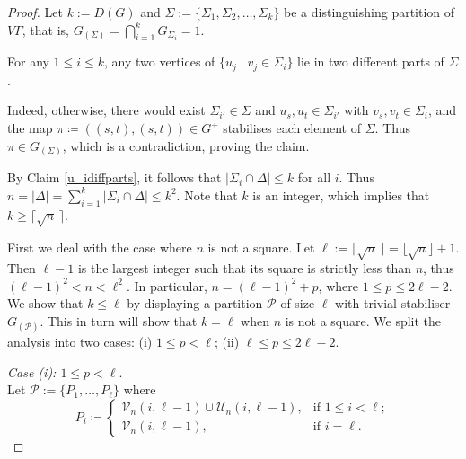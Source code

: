 \documentclass[10pt,a4paper]{amsart}
\begin{document}
\begin{proof}
 
Let \(k:=D(G)\) and $\Sigma:=\{\Sigma_1 , \Sigma_2, \ldots,\Sigma_k\}$  be a distinguishing  partition of \(V\Gamma\), that is, \(G_{(\Sigma)}=\bigcap_{i=1}^{k}G_{\Sigma_{i}}=1\).
\begin{claim}\label{u_idiffparts}
For any \(1\leqslant i\leqslant  k\), any two vertices of \(\{u_j \mid v_j\in \Sigma_i\}\) lie in two different parts of \(\Sigma\).
\end{claim}
Indeed, otherwise, there would exist \(\Sigma_{i'}\in\Sigma\) and \(u_s, u_t\in \Sigma_{i'}\) with \(v_s,v_t\in \Sigma_i\), and the map \(\pi\coloneqq ((s,t),(s,t))\in G^+\) stabilises each element of  \(\Sigma\).
Thus \(\pi\in G_{(\Sigma)}\), which is a contradiction, proving the claim.

By Claim \ref{u_idiffparts}, it follows that \(|\Sigma_{i}\cap \Delta|\leqslant k\) for all \(i\).
Thus \(n=|\Delta|=\sum_{i=1}^{k}|\Sigma_{i}\cap\Delta|\leqslant k^{2}\).
Note that \(k\) is an integer, which implies that \(k\geqslant \lceil\sqrt{n}\,\rceil.\)



First we deal with the case where \(n\) is not a square. 
Let \(\ell:=\lceil\sqrt{n}\,\rceil=\lfloor \sqrt{n}\rfloor+1\).
Then \(\ell-1\) is the largest integer such that its square is strictly less than \(n\),
thus \((\ell-1)^{2} < n < \ell^2\).
In particular, \(n=(\ell-1)^{2}+p\), where \(1 \leqslant p \leqslant 2\ell-2\).  We show that \(k\leqslant \ell\) by displaying a partition \(\mathcal{P}\) of size \(\ell\) with trivial stabiliser \(G_{(\mathcal{P})}\). This in turn will show that \(k=\ell\) when \(n\) is not a square.
We split the analysis into two cases: (i) \(1 \leqslant p< \ell\); (ii) \(\ell \leqslant p \leqslant 2\ell-2\).


 \medskip\noindent
\emph{Case (i):  \(1 \leqslant p< \ell\)}. \\Let \(\mathcal{P}:=\{P_{1},\ldots, P_{\ell}\}\) where
\begin{equation*} 
P_{i}  \coloneqq
\begin{cases}
   \mathcal{V}_n(i,\ell-1) \cup \mathcal{U}_n(i,\ell-1),& \text{if } 1\leqslant i < \ell;\\ 
   \mathcal{V}_n(i,\ell-1), & \text{if } i=\ell.
\end{cases}
\end{equation*}


\end{proof}
\end{document}
